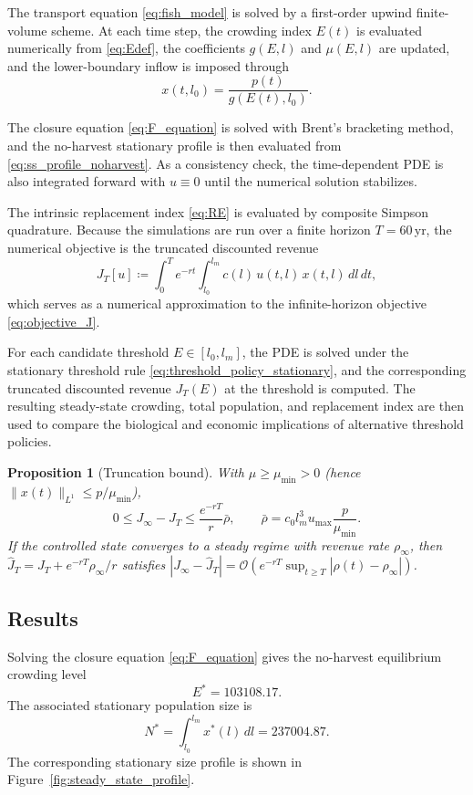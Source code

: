 \documentclass[pdflatex,sn-mathphys-num]{sn-jnl}
\newcommand{\Ord}{\mathcal{O}}
\theoremstyle{thmstyleone}
\newtheorem{proposition}[theorem]{Proposition}
\theoremstyle{definition}
\theoremstyle{remark}
\begin{document}
The transport equation \eqref{eq:fish_model} is solved by a first-order upwind finite-volume scheme. At each time step, the crowding index $E(t)$ is evaluated numerically from \eqref{eq:Edef}, the coefficients $g(E,l)$ and $\mu(E,l)$ are updated, and the lower-boundary inflow is imposed through
\[
x(t,l_0)=\frac{p(t)}{g(E(t),l_0)}.
\]

The closure equation \eqref{eq:F_equation} is solved with Brent's bracketing method, and the no-harvest stationary profile is then evaluated from \eqref{eq:ss_profile_noharvest}. As a consistency check, the time-dependent PDE is also integrated forward with $u\equiv 0$ until the numerical solution stabilizes.

The intrinsic replacement index \eqref{eq:RE} is evaluated by composite Simpson quadrature. Because the simulations are run over a finite horizon $T=60$\,yr, the numerical objective is the truncated discounted revenue
\begin{equation}\label{eq:JT_num}
J_T[u]\coloneqq
\int_0^T e^{-rt}\int_{l_0}^{l_m} c(l)\,u(t,l)\,x(t,l)\,dl\,dt,
\end{equation}
which serves as a numerical approximation to the infinite-horizon objective \eqref{eq:objective_J}.

For each candidate threshold $E\in[l_0,l_m]$, the PDE is solved under the stationary threshold rule \eqref{eq:threshold_policy_stationary}, and the corresponding truncated discounted revenue $J_T(E)$ at the threshold is computed. The resulting steady-state crowding, total population, and replacement index are then used to compare the biological and economic implications of alternative threshold policies.

\begin{proposition}[Truncation bound]\label{prop:trunc}
With $\mu\ge\mu_{\min}>0$ (hence $\|x(t)\|_{L^1}\le p/\mu_{\min}$),
\[
0\le J_\infty-J_T\le\frac{e^{-rT}}{r}\bar\rho,\qquad
\bar\rho=c_0 l_m^3 u_{\max}\frac{p}{\mu_{\min}} .
\]
If the controlled state converges to a steady regime with revenue rate
$\rho_\infty$, then $\widehat J_T=J_T+e^{-rT}\rho_\infty/r$ satisfies
$|J_\infty-\widehat J_T|=\Ord(e^{-rT}\sup_{t\ge T}|\rho(t)-\rho_\infty|)$.
\end{proposition}

\subsection{Results}\label{subsec:results}

Solving the closure equation \eqref{eq:F_equation} gives the no-harvest
equilibrium crowding level
\[
E^*=103108.17.
\]
The associated stationary population size is
\[
N^*=\int_{l_0}^{l_m}x^*(l)\,dl = 237004.87.
\]
The corresponding stationary size profile is shown in Figure~\ref{fig:steady_state_profile}.
\end{document}
